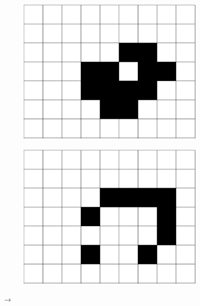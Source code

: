 \documentclass[12pt]{article}
\numberwithin{figure}{section} %
\begin{document}
\begin{figure}[H]
\begin{subfigure}{0.18\textwidth}
     		\includegraphics[width=\linewidth]{Section1/5.3}
     		\subcaption{}
   	\end{subfigure}
   	\begin{subfigure}{0.18\textwidth}
     		\centering
     		\includegraphics[width=\linewidth]{Section1/5.4}
     		\subcaption{}
   	\end{subfigure}
   	{\LARGE$\rightarrow{}$}
	\setcounter{subfigure}{0}
	\centering
 	\begin{subfigure}{0.18\textwidth}
     		\centering

\end{subfigure}
\end{figure}
\end{document}
